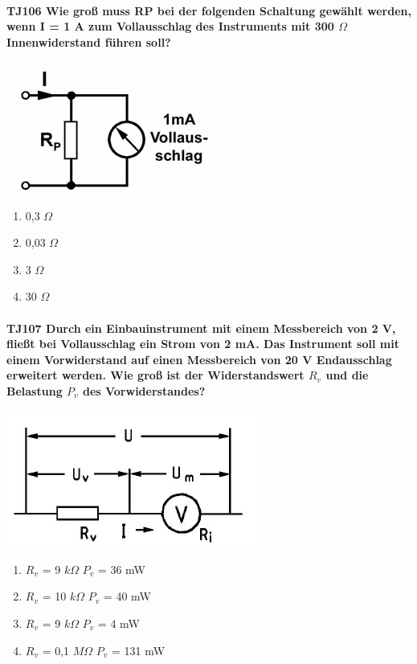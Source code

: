 \documentclass[8pt]{article}
\begin{document}
\paragraph*{TJ106 Wie groß muss RP bei der folgenden Schaltung gewählt werden, wenn I = 1 A zum Vollausschlag des Instruments mit 300 $\Omega$ Innenwiderstand führen soll?}
\begin{center}
	\begin{minipage}{\linewidth}
		\centering
		\includegraphics[scale=1.0]{pics/tj106_a.jpg}
	\end{minipage}
\end{center}
\begin{enumerate}[nolistsep,label=\Alph*]
\item 0,3 $\Omega$
\item 0,03 $\Omega$
\item 3 $\Omega$
\item 30 $\Omega$
\end{enumerate}

\paragraph*{TJ107 Durch ein Einbauinstrument mit einem Messbereich von 2 V, fließt bei Vollausschlag ein Strom von 2 mA. Das Instrument soll mit einem Vorwiderstand auf einen Messbereich von 20 V Endausschlag erweitert werden. Wie groß ist der Widerstandswert $R_{v}$ und die Belastung $P_{v}$ des Vorwiderstandes?}
\begin{center}
	\begin{minipage}{\linewidth}
		\centering
		\includegraphics[scale=1.0]{pics/tj107_a.jpg}
	\end{minipage}
\end{center}
\begin{enumerate}[nolistsep,label=\Alph*]
\item $R_{v}$ = 9 $k\Omega$ $P_{v}$ = 36 mW
\item $R_{v}$ = 10 $k\Omega$ $P_{v}$ = 40 mW
\item $R_{v}$ = 9 $k\Omega$ $P_{v}$ = 4 mW
\item $R_{v}$ = 0,1 $M\Omega$ $P_{v}$ = 131 mW
\end{enumerate}
\end{document}
